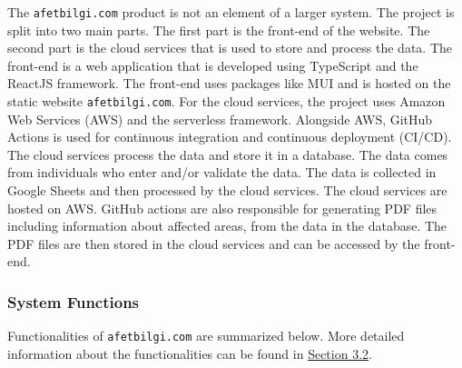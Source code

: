\documentclass[a4paper]{article}
\begin{document}
                The \verb*|afetbilgi.com| product is not an element of a larger system. The project is split into two main parts.
                The first part is the front-end of the website. The second part is the cloud services that is used to store and
                process the data. The front-end is a web application that is developed using TypeScript and the ReactJS framework.
                The front-end uses packages like MUI and is hosted on the static website \verb*|afetbilgi.com|. 
                For the cloud services, the project uses Amazon Web Services (AWS) and the serverless framework. Alongside AWS,
                GitHub Actions is used for continuous integration and continuous deployment (CI/CD). The cloud services process 
                the data and store it in a database. The data comes from individuals who enter and/or validate the data. The data
                is collected in Google Sheets and then processed by the cloud services. The cloud services are hosted on AWS.
                GitHub actions are also responsible for generating PDF files including information about affected areas, from the
                data in the database. The PDF files are then stored in the cloud services and can be accessed by the front-end.

                \subsubsection{System Functions}
                
                Functionalities of \verb*|afetbilgi.com| are summarized below. More detailed information about the functionalities can be found in \hyperlink{subsection.3.2}{Section 3.2}.
\end{document}
